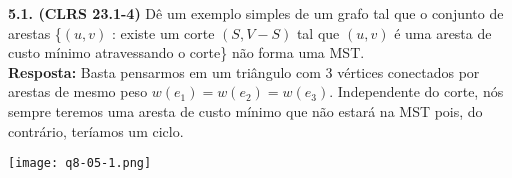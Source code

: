 
\noindent\textbf{5.1. (CLRS 23.1-4)} Dê um exemplo simples de um grafo tal que o conjunto de arestas \{$(u, v)$ : existe um corte $(S, V - S)$ tal que $(u, v)$ é uma aresta de custo mínimo atravessando o corte\} não forma uma MST.\\[6pt]
\textbf{Resposta:} Basta pensarmos em um triângulo com 3 vértices conectados por arestas de mesmo peso $w(e_1) = w(e_2) = w(e_3)$. Independente do corte, nós sempre teremos uma aresta de custo mínimo que não estará na MST pois, do contrário, teríamos um ciclo.

\begin{center}
\texttt{[image: q8-05-1.png]}
\label{fig:8.5-1-1}
\end{center}
